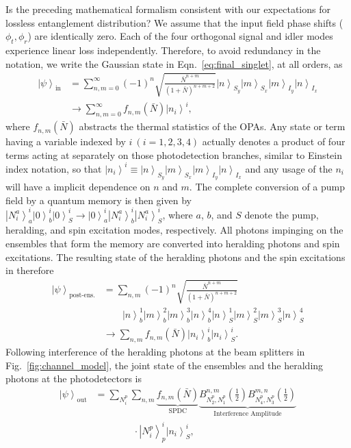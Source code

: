 \documentclass[aps,twocolumn,secnumarabic,amsmath,amssymb,pra,groupedaddress,
showpacs, showkeys]{revtex4-1}
\newcommand{\ket}[1]{\left|#1\right\rangle}
\newcommand{\pna}[1]{\left(#1\right)}
\begin{document}
Is the preceding mathematical formalism consistent with our expectations for
lossless entanglement distribution? We assume that the input field phase shifts
($\phi_t,\phi_r$) are identically zero. Each of the four orthogonal signal and
idler modes experience linear loss independently. Therefore, to avoid
redundancy in the notation, we write the Gaussian state in
Eqn.~\ref{eq:final_singlet}, at all orders, as 
\begin{align}
\ket{\psi}_{\textrm{in}}&=\sum_{n,m=0}^{\infty}
\pna{-1}^n\sqrt{\frac{\bar{N}^{n+m}}{\pna{1+\bar{N}}^{n+m+2}}} \ket{n}_{S_y}\ket{m}_{S_x}\ket{m}_{I_y}\ket{n}_{I_x}
\nonumber \\
 & \rightarrow \sum_{n,m=0}^{\infty} f_{n,m}\pna{\bar{N}}\ket{n_i}^i,
\end{align}
where $f_{n,m}\pna{\bar{N}}$ abstracts the thermal statistics of the OPAs. Any
state or term having a variable indexed by $i~\pna{i=1,2,3,4}$ actually denotes
a product of four terms acting at separately on those photodetection branches,
similar to Einstein index notation, so that $\ket{n_i}^i\equiv
\ket{n}_{S_y}\ket{m}_{S_x}\ket{m}_{I_y}\ket{n}_{I_x}$ and any usage of the
$n_i$ will have a implicit dependence on $n$ and $m$. The complete conversion
of a pump field by a quantum memory is then given by
$\ket{N^a_i}_a^i\ket{0}_b^i\ket{0}_S^i\rightarrow\ket{0}_a^i\ket{N^a_i}_b^i\ket{N^a_i}_S^i$,
where $a$, $b$, and $S$ denote the pump, heralding, and spin excitation modes,
respectively. All photons impinging on the ensembles that form the memory are
converted into heralding photons and spin excitations. The resulting state of
the heralding photons and the spin excitations in therefore
\begin{align}
\ket{\psi}_{\textrm{post-ens.}}& = \sum_{n,m}
\pna{-1}^n\sqrt{\frac{\bar{N}^{n+m}}{\pna{1+\bar{N}}^{n+m+2}}}  \nonumber \\
& \qquad \ket{n}^1_b \ket{m}^2_b \ket{m}^3_b \ket{n}^4_b 
\ket{n}^1_S \ket{m}^2_S \ket{m}^3_S \ket{n}^4_S  \nonumber  \\
& \rightarrow \sum_{n,m}f_{n,m}\pna{\bar{N}}\ket{n_i}^i_b\ket{n_i}^i_S.
\end{align}
Following interference of the heralding photons at the beam splitters in
Fig.~\ref{fig:channel_model}, the joint state of the ensembles and the
heralding photons at the photodetectors is
\begin{align}
\ket{\psi}_{\textrm{out}} &=\sum_{N_i^p}\sum_{n,m} \underbrace{f_{n,m}\pna{\bar{N}}}_\text{SPDC} \underbrace{B_{N_2^p,N_1^p}^{n,m}\pna{\frac{1}{2}}  
B_{N_4^p,N_3^p}^{m,n}\pna{\frac{1}{2}}}_\text{Interference Amplitude}\nonumber
\\ & \qquad \qquad \cdot\ket{N_i^p}^i_p\ket{n_i}^i_S, \label{eq:chap3:lossless_output}
\end{align}
\end{document}
